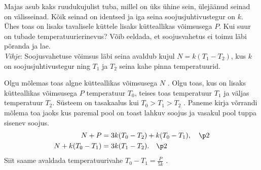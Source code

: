 
Majas asub kaks ruudukujulist tuba, millel on üks ühine sein, ülejäänud seinad on välisseinad. Kõik seinad on identsed ja iga seina soojusjuhtivustegur on $k$. Ühes toas on lisaks tavalisele küttele lisaks kütteallikas võimsusega $P$. Kui suur on tubade temperatuurierinevus? Võib eeldada, et soojusvahetus ei toimu läbi põranda ja lae.
\\\emph{Vihje}: Soojusvahetuse võimsus läbi seina avaldub kujul $N=k(T_1-T_2)$, kus $k$ on soojusjuhtivustegur ning $T_1$ ja $T_2$ seina kahe pinna temperatuurid.


\hint

\solu
Olgu mõlemas toas algne kütteallikas võimsusega $N$ . Olgu toas, kus on lisaks kütteallikas võimsusega $P$ temperatuur $T_0$, teises toas temperatuur $T_1$ ja väljas temperatuur $T_2$. Süsteem on tasakaalus kui $T_0 > T_1 > T_2$ . Paneme kirja võrrandi mõlema toa jaoks kus paremal pool on toast lahkuv soojus ja vasakul pool tuppa sisenev soojus.
\begin{align*}
  N+P&=3k(T_0 - T_2)+k(T_0-T_1), \quad \p2\\
  N+k(T_0-T_1)&=3k(T_1 - T_2). \quad \p2
\end{align*}
Siit saame avaldada temperatuurivahe $T_0-T_1=\frac{P}{5k}$ .
\probend